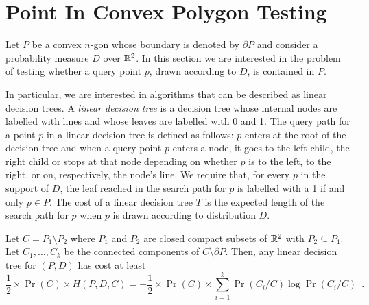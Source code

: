 \documentclass[charterfonts,lotsofwhite]{patmorin}
\begin{document}
\section{Point In Convex Polygon Testing}

Let $P$ be a convex $n$-gon whose boundary is denoted by $\partial P$
and consider a probability measure $D$ over $\mathbb{R}^2$.  In this section
we are interested in the problem of testing whether a query point $p$,
drawn according to $D$, is contained in $P$.   

In particular, we are interested in algorithms that can be described
as linear decision trees.  A \emph{linear decision tree} is a decision
tree whose internal nodes are labelled with lines and whose leaves are
labelled with 0 and 1.  The query path for a point $p$ in a linear
decision tree is defined as follows: $p$ enters at the root of the
decision tree and when a query point $p$ enters a node, it goes to the
left child, the right child or stops at that node depending on whether
$p$ is to the left, to the right, or on, respectively, the node's
line.  We require that, for every $p$ in the support of $D$, the leaf
reached in the search path for $p$ is labelled with a 1 if and only
$p\in P$.  The cost of a linear decision tree $T$ is the expected
length of the search path for $p$ when $p$ is drawn according to
distribution $D$.

\begin{lem}
Let $C=P_1\setminus P_2$ where $P_1$ and $P_2$ are closed compact
subsets of $\mathbb{R}^2$ with $P_2\subseteq P_1$.  Let $C_1,\ldots,C_k$ be
the connected components of $C\setminus\partial P$.  Then, any linear
decision tree for $(P,D)$ has cost at least
\[
	\frac{1}{2}\times \Pr(C)\times H(P,D,C) 
		= -\frac{1}{2}\times\Pr(C)\times 
			\sum_{i=1}^k \Pr(C_i/C)\log \Pr(C_i/C)
		\enspace .
\]
\end{lem}
\end{document}
